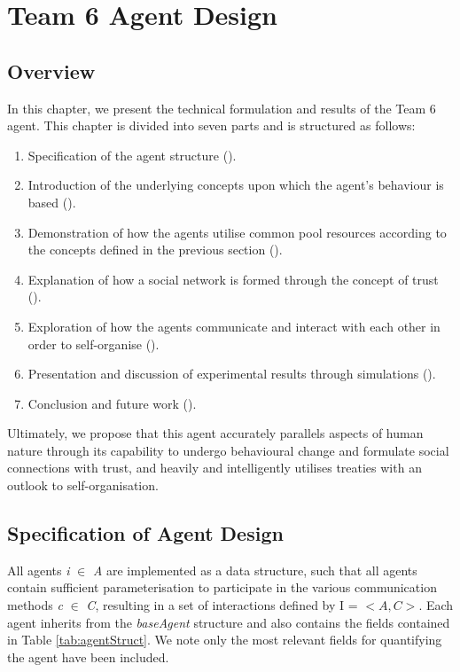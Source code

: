\chapter{Team 6 Agent Design}\label{team_6_agent_design}

\section{Overview}

In this chapter, we present the technical formulation and results of the Team 6 agent. This chapter is divided into seven parts and is structured as follows: 
\begin{enumerate}
    \item Specification of the agent structure ().
    \item Introduction of the underlying concepts upon which the agent's behaviour is based (). 
    \item Demonstration of how the agents utilise common pool resources according to the concepts defined in the previous section (). 
    \item Explanation of how a social network is formed through the concept of trust ().
    \item Exploration of how the agents communicate and interact with each other in order to self-organise ().
    \item Presentation and discussion of experimental results through simulations ().
    \item Conclusion and future work ().
\end{enumerate}

Ultimately, we propose that this agent accurately parallels aspects of human nature through its capability to undergo behavioural change and formulate social connections with trust, and heavily and intelligently utilises treaties with an outlook to self-organisation.


\section{Specification of Agent Design}\label{agent-specification}

All agents \textit{i} $\in$ \textit{A} are implemented as a data structure, such that all agents contain sufficient parameterisation to participate in the various communication methods \textit{c} $\in$ \textit{C}, resulting in a set of interactions defined by I = $< \mathit{A, C} >$. Each agent inherits from the \textit{baseAgent} structure and also contains the fields contained in Table \ref{tab:agentStruct}. We note only the most relevant fields for quantifying the agent have been included.

